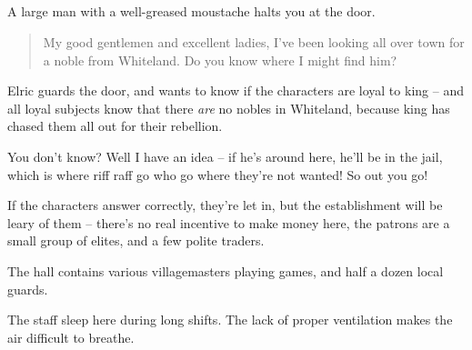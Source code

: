 \subsection{}


\setcounter{list}{0}

\begin{multicols}{2}


\begin{boxtext}

	A large man with a well-greased moustache halts you at the door.

	\begin{quotation}

		My good gentlemen and excellent ladies, I've been looking all over town for a noble from Whiteland.  Do you know where I might find him?

	\end{quotation}

\end{boxtext}

Elric guards the door, and wants to know if the characters are loyal to \gls{king} -- and all loyal subjects know that there \emph{are} no nobles in Whiteland, because \gls{king} has chased them all out for their rebellion.

\begin{speechtext}

	You don't know?  Well I have an idea -- if he's around here, he'll be in the jail, which is where riff raff go who go where they're not wanted!
	So out you go!

\end{speechtext}

If the characters answer correctly, they're let in, but the establishment will be leary of them -- there's no real incentive to make money here, the patrons are a small group of elites, and a few polite traders.

The hall contains various villagemasters playing games, and half a dozen local guards.


The staff sleep here during long shifts.  The lack of proper ventilation makes the air difficult to breathe.


\begin{boxtext}


\end{boxtext}
\end{multicols}
